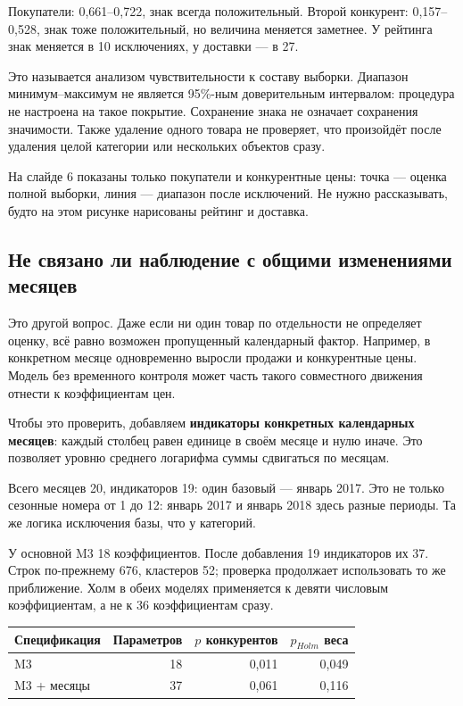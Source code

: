 \documentclass[12pt,a4paper]{article}
\begin{document}
Покупатели: 0,661--0,722, знак всегда положительный. Второй конкурент: 0,157--0,528, знак тоже положительный, но величина меняется заметнее. У рейтинга знак меняется в 10 исключениях, у доставки --- в 27.

Это называется анализом чувствительности к составу выборки. Диапазон минимум--максимум не является 95\%-ным доверительным интервалом: процедура не настроена на такое покрытие. Сохранение знака не означает сохранения значимости. Также удаление одного товара не проверяет, что произойдёт после удаления целой категории или нескольких объектов сразу.

На слайде 6 показаны только покупатели и конкурентные цены: точка --- оценка полной выборки, линия --- диапазон после исключений. Не нужно рассказывать, будто на этом рисунке нарисованы рейтинг и доставка.

\subsection{Не связано ли наблюдение с общими изменениями месяцев}

Это другой вопрос. Даже если ни один товар по отдельности не определяет оценку, всё равно возможен пропущенный календарный фактор. Например, в конкретном месяце одновременно выросли продажи и конкурентные цены. Модель без временного контроля может часть такого совместного движения отнести к коэффициентам цен.

Чтобы это проверить, добавляем \textbf{индикаторы конкретных календарных месяцев}: каждый столбец равен единице в своём месяце и нулю иначе. Это позволяет уровню среднего логарифма суммы сдвигаться по месяцам.

Всего месяцев 20, индикаторов 19: один базовый --- январь 2017. Это не только сезонные номера от 1 до 12: январь 2017 и январь 2018 здесь разные периоды. Та же логика исключения базы, что у категорий.

У основной M3 18 коэффициентов. После добавления 19 индикаторов их 37. Строк по-прежнему 676, кластеров 52; проверка продолжает использовать то же приближение. Холм в обеих моделях применяется к девяти числовым коэффициентам, а не к 36 коэффициентам сразу.

\begin{center}\small
\begin{tabular}{lrrr}
\toprule
Спецификация & Параметров & $p$ конкурентов & $p_{Holm}$ веса \\
\midrule
M3 & 18 & 0,011 & 0,049 \\
M3 + месяцы & 37 & 0,061 & 0,116 \\
\bottomrule
\end{tabular}
\end{center}
\end{document}
